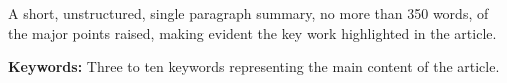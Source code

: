 A short, unstructured, single paragraph summary, no more than 350 words, of the major points raised, making evident the key work highlighted in the article.

\textbf{Keywords:} Three to ten keywords representing the main content of the article.